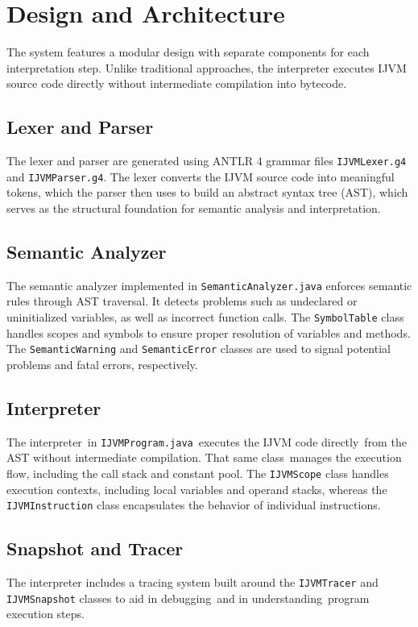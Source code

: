 \documentclass[11pt]{article}
\begin{document}
\section{Design and Architecture}
The system features a modular design with separate components for each interpretation step. Unlike traditional approaches, the interpreter executes IJVM source code directly without intermediate compilation into bytecode.

\subsection{Lexer and Parser}
The lexer and parser are generated using ANTLR 4 grammar files \texttt{IJVMLexer.g4} and \texttt{IJVMParser.g4}.  The lexer converts the IJVM source code into meaningful tokens, which the parser then uses to build an abstract syntax tree (AST), which serves as the structural foundation for semantic analysis and interpretation.

\subsection{Semantic Analyzer}
The semantic analyzer implemented in \texttt{SemanticAnalyzer.java} enforces semantic rules through AST traversal. It detects problems such as undeclared or uninitialized variables, as well as incorrect function calls. The \texttt{SymbolTable} class handles scopes and symbols to ensure proper resolution of variables and methods. The \texttt{SemanticWarning} and \texttt{SemanticError} classes are used to signal potential problems and fatal errors, respectively.

\subsection{Interpreter}
The interpreter in \texttt{IJVMProgram.java} executes the IJVM code directly from the AST without intermediate compilation. That same class manages the execution flow, including the call stack and constant pool. The \texttt{IJVMScope} class handles execution contexts, including local variables and operand stacks, whereas the \texttt{IJVMInstruction} class encapsulates the behavior of individual instructions.

\subsection{Snapshot and Tracer}
 The interpreter includes a tracing system built around the \texttt{IJVMTracer} and \texttt{IJVMSnapshot} classes to aid in debugging and in understanding program execution steps.
\end{document}
